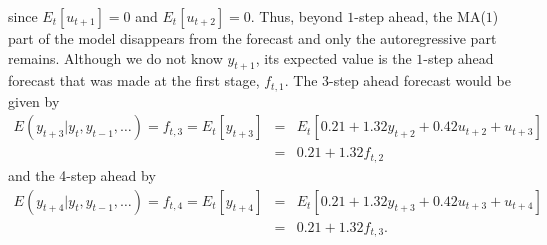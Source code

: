 \documentclass[11pt,a4paper]{article}
\begin{document}
\begin{itemize}
\begin{itemize}
$$$$
since $E_t[u_{t+1}]=0$ and $E_t[u_{t+2}]=0$. Thus, beyond $1$-step ahead, the
 MA($1$) part of the model disappears from the forecast and only the
autoregressive part remains. Although we do not know $y_{t+1}$, its expected
value is the $1$-step ahead forecast that was made at the first stage, $f_{t,1}$.
The 3-step ahead forecast would be given by
$$
\begin{array}{rcl}
E ( y_{t + 3}| y_t, y_{t -1}, \ldots) = f_{t,3} = E_t [ y_{t + 3} ] & = & E_t [0.21 + 1.32 y_{t + 2} + 0.42 u_{t + 2} + u_{t + 3} ] \\
&= & 0.21 + 1.32 f_{t,2}
\end{array}
$$
and the 4-step ahead by
$$
\begin{array}{rcl}
E ( y_{t + 4}| y_t , y_{t -1}, \ldots) = f_{t,4} = E_t [ y_{t + 4} ] & = & E_t [0.21 + 1.32 y_{t + 3} + 0.42 u_{t + 3} + u_{t + 4} ] \\
& = & 0.21 + 1.32 f_{t ,3}.
\end{array}
$$


\end{itemize}
\end{itemize}
\end{document}
